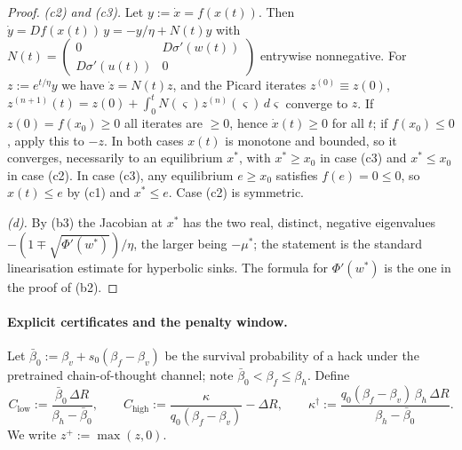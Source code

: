 \begin{proof}
\emph{(c2) and (c3).} Let $y:=\dot x=f(x(t))$. Then
$\dot y=Df(x(t))\,y=-y/\eta+N(t)y$ with
$N(t)=\begin{pmatrix}0&D\sigma'(w(t))\\D\sigma'(u(t))&0\end{pmatrix}$
entrywise nonnegative. For $z:=e^{t/\eta}y$ we have $\dot z=N(t)z$, and the
Picard iterates $z^{(0)}\equiv z(0)$,
$z^{(n+1)}(t)=z(0)+\int_0^tN(\varsigma)z^{(n)}(\varsigma)\,d\varsigma$
converge to $z$. If $z(0)=f(x_0)\ge0$ all iterates are $\ge0$, hence
$\dot x(t)\ge0$ for all $t$; if $f(x_0)\le0$, apply this to $-z$. In both
cases $x(t)$ is monotone and bounded, so it converges, necessarily to an
equilibrium $x^\ast$, with $x^\ast\ge x_0$ in case (c3) and $x^\ast\le x_0$
in case (c2). In case (c3), any equilibrium $e\ge x_0$ satisfies
$f(e)=0\le0$, so $x(t)\le e$ by (c1) and $x^\ast\le e$. Case (c2) is
symmetric.

\emph{(d).} By (b3) the Jacobian at $x^\ast$ has the two real, distinct,
negative eigenvalues $-(1\mp\sqrt{\Phi'(w^\ast)})/\eta$, the larger being
$-\mu^\ast$; the statement is the standard linearisation estimate for
hyperbolic sinks. The formula for $\Phi'(w^\ast)$ is the one in the proof
of (b2).
\end{proof}

\paragraph{Explicit certificates and the penalty window.}
Let $\bar\beta_0:=\beta_v+s_0(\beta_f-\beta_v)$ be the survival probability
of a hack under the pretrained chain-of-thought channel; note
$\bar\beta_0<\beta_f\le\beta_h$. Define
\[
C_{\mathrm{low}}:=\frac{\bar\beta_0\,\Delta R}{\beta_h-\bar\beta_0},\qquad
C_{\mathrm{high}}:=\frac{\kappa}{q_0(\beta_f-\beta_v)}-\Delta R,\qquad
\kappa^\dagger:=\frac{q_0(\beta_f-\beta_v)\,\beta_h\,\Delta R}{\beta_h-\bar\beta_0}.
\]
We write $z^+:=\max(z,0)$.

